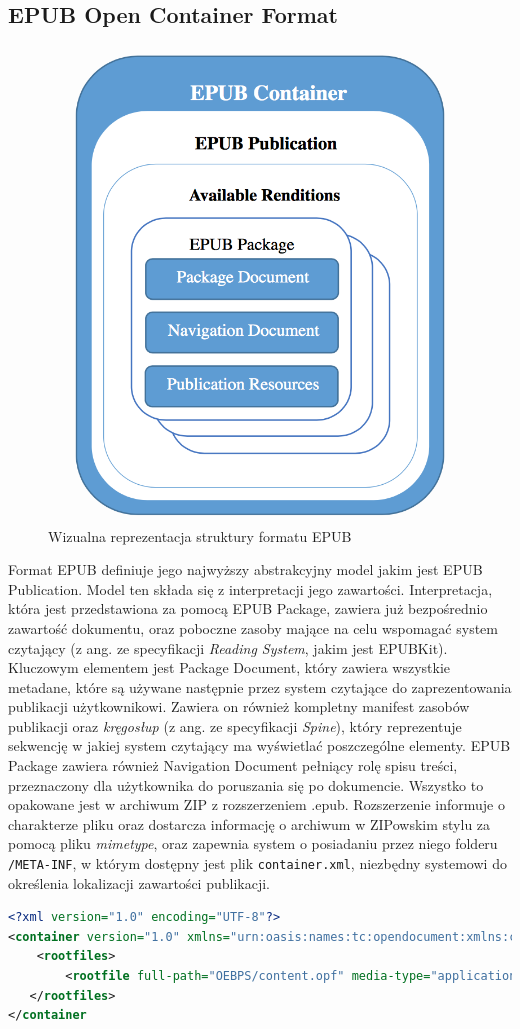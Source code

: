 \subsection{EPUB Open Container Format}

\begin{figure}[ht!]
  \centering
  \includegraphics[width=.4\linewidth]{images/chapter-3-image-1-structure.png}
  \caption{Wizualna reprezentacja struktury formatu EPUB\cite{EPUBSpecificationRoadMap}}
\end{figure}

Format EPUB definiuje jego najwyższy abstrakcyjny model jakim jest EPUB Publication. Model ten składa się z interpretacji jego zawartości. Interpretacja, która jest przedstawiona za pomocą EPUB Package, zawiera już bezpośrednio zawartość dokumentu, oraz poboczne zasoby mające na celu wspomagać system czytający (z ang. ze specyfikacji \textit{Reading System}, jakim jest EPUBKit). Kluczowym elementem jest Package Document, który zawiera wszystkie metadane, które są używane następnie przez system czytające do zaprezentowania publikacji użytkownikowi. Zawiera on również kompletny manifest zasobów publikacji oraz \textit{kręgosłup} (z ang. ze specyfikacji \textit{Spine}), który reprezentuje sekwencję w jakiej system czytający ma wyświetlać poszczególne elementy. EPUB Package zawiera również Navigation Document pełniący rolę spisu treści, przeznaczony dla użytkownika do poruszania się po dokumencie. Wszystko to opakowane jest w archiwum ZIP z rozszerzeniem .epub. Rozszerzenie informuje o charakterze pliku oraz dostarcza informację o archiwum w ZIPowskim stylu za pomocą pliku \textit{mimetype}, oraz zapewnia system o posiadaniu przez niego folderu \texttt{/META-INF}, w którym dostępny jest plik \texttt{container.xml}, niezbędny systemowi do określenia lokalizacji zawartości publikacji.

\begin{lstlisting}[caption={Przykładowy plik container.xml}, language=XML,label=container-xml]
<?xml version="1.0" encoding="UTF-8"?>
<container version="1.0" xmlns="urn:oasis:names:tc:opendocument:xmlns:container">
    <rootfiles>
        <rootfile full-path="OEBPS/content.opf" media-type="application/oebps-package+xml"/>
   </rootfiles>
</container
\end{lstlisting}

